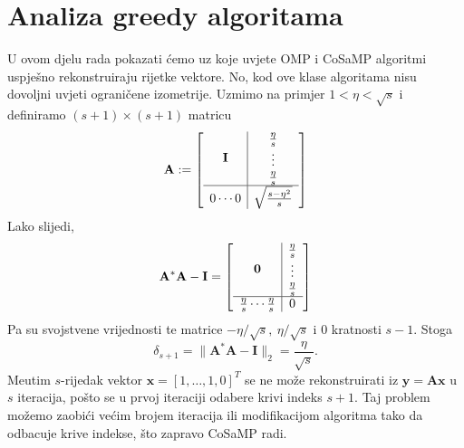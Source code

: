 \documentclass[a4paper,twoside,12pt]{memoir} %
\newcommand{\vect}[1]{\mathbf{#1}}
\renewcommand{\vec}{\vect}
\newcommand{\norm}[1]{\|{#1}\|}
\begin{document}
\section[Analiza greedy algoritama][Analiza greedy algoritama]{Analiza greedy algoritama}
U ovom djelu rada pokazati \'cemo uz koje uvjete OMP i CoSaMP algoritmi uspje\v{s}no rekonstruiraju rijetke vektore. No, kod ove klase algoritama nisu dovoljni uvjeti ograni\v{c}ene izometrije. Uzmimo na primjer $1 < \eta < \sqrt{s}$ i definiramo $(s+1) \times (s+1)$ matricu
\begin{equation}\label{6:39}
    \vec A :=
    \left[
        \begin{array}{c | c}
            \vec I & \begin{matrix*}
                \frac{\eta}{s}\\ 
                \vdots\\
                \frac{\eta}{s}\\ 
            \end{matrix*}\\
            \hline
            0 \cdots 0 & \sqrt{\frac{s-\eta^2}{s}}\\
        \end{array}
    \right]
\end{equation}
Lako slijedi,
\begin{equation*}
    \vec A^* \vec A - \vec I =
    \left[
        \begin{array}{c | c}
            \vec 0 & \begin{matrix*}
                \frac{\eta}{s}\\ 
                \vdots\\
                \frac{\eta}{s}\\ 
            \end{matrix*}\\
            \hline
            \frac{\eta}{s}  \cdots  \frac{\eta}{s} & 0
        \end{array}
    \right]
\end{equation*}
Pa su svojstvene vrijednosti te matrice $-\eta/\sqrt{s},\ \eta/\sqrt{s}$ i $0$ kratnosti $s-1$. Stoga
\begin{equation*}
    \delta_{s+1} = \norm{\vec A^* \vec A - \vec I}_2 = \frac{\eta}{\sqrt{s}}. 
\end{equation*}
Me\dj utim $s$-rijedak vektor $\vec x = [1, \dots, 1, 0]^T$ se ne mo\v{z}e rekonstruirati iz $\vec y = \vec{Ax}$ u $s$ iteracija, po\v{s}to se u prvoj iteraciji odabere krivi indeks $s+1$. Taj problem mo\v{z}emo zaobi\'ci ve\'cim brojem iteracija ili modifikacijom algoritma tako da odbacuje krive indekse, \v{s}to zapravo CoSaMP radi.
\end{document}
